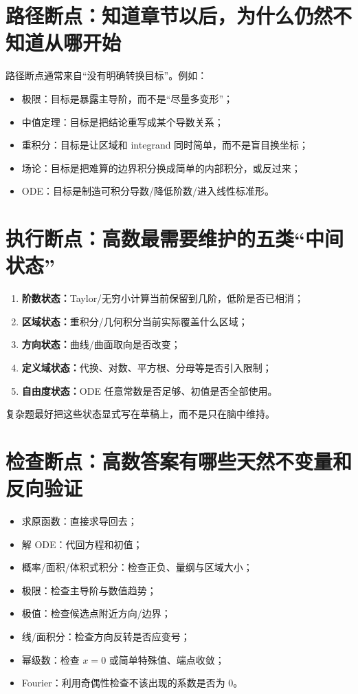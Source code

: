 \documentclass[11pt,a4paper,openany]{ctexbook}
\newcommand{\key}[1]{\textbf{\color{deep}#1}}
\begin{document}
\section{路径断点：知道章节以后，为什么仍然不知道从哪开始}
路径断点通常来自“没有明确转换目标”。例如：
\begin{itemize}
  \item 极限：目标是暴露主导阶，而不是“尽量多变形”；
  \item 中值定理：目标是把结论重写成某个导数关系；
  \item 重积分：目标是让区域和 integrand 同时简单，而不是盲目换坐标；
  \item 场论：目标是把难算的边界积分换成简单的内部积分，或反过来；
  \item ODE：目标是制造可积分导数/降低阶数/进入线性标准形。
\end{itemize}

\section{执行断点：高数最需要维护的五类“中间状态”}
\begin{enumerate}
  \item \key{阶数状态：}Taylor/无穷小计算当前保留到几阶，低阶是否已相消；
  \item \key{区域状态：}重积分/几何积分当前实际覆盖什么区域；
  \item \key{方向状态：}曲线/曲面取向是否改变；
  \item \key{定义域状态：}代换、对数、平方根、分母等是否引入限制；
  \item \key{自由度状态：}ODE 任意常数是否足够、初值是否全部使用。
\end{enumerate}
复杂题最好把这些状态显式写在草稿上，而不是只在脑中维持。

\section{检查断点：高数答案有哪些天然不变量和反向验证}
\begin{itemize}
  \item 求原函数：直接求导回去；
  \item 解 ODE：代回方程和初值；
  \item 概率/面积/体积式积分：检查正负、量纲与区域大小；
  \item 极限：检查主导阶与数值趋势；
  \item 极值：检查候选点附近方向/边界；
  \item 线/面积分：检查方向反转是否应变号；
  \item 幂级数：检查 $x=0$ 或简单特殊值、端点收敛；
  \item Fourier：利用奇偶性检查不该出现的系数是否为 0。
\end{itemize}
\end{document}
